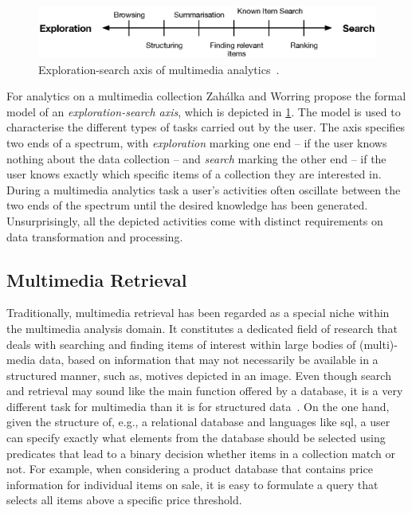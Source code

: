 \begin{figure}[h]
    \centering
    \includegraphics[width=\textwidth]{figures/exploration_search_axis.eps}
    \caption{Exploration-search axis of multimedia analytics~\cite{Zahalka:2014Towards}.}
    \label{figure:exploration-search-axis}
\end{figure}

For analytics on a multimedia collection Zahálka and Worring \cite{Zahalka:2014Towards} propose the formal model of an \emph{exploration-search axis}, which is depicted in \cref{figure:exploration-search-axis}. The model is used to characterise the different types of tasks carried out by the user. The axis specifies two ends of a spectrum, with \emph{exploration} marking one end -- if the user knows nothing about the data collection -- and \emph{search} marking the other end -- if the user knows exactly which specific items of a collection they are interested in. During a multimedia analytics task a user's activities often oscillate between the two ends of the spectrum until the desired knowledge has been generated. Unsurprisingly, all the depicted activities come with distinct requirements on data transformation and processing.

\subsection{Multimedia Retrieval}

Traditionally, multimedia retrieval has been regarded as a special niche within the  multimedia analysis domain. It constitutes a dedicated field of research that deals with searching and finding items of interest within large bodies of (multi)-media data, based on information that may not necessarily be available in a structured manner, such as, motives depicted in an image. Even though search and retrieval may sound like the main function offered by a database, it is a very different task for multimedia than it is for structured data~\cite{Blanken:2007multimedia}. On the one hand, given the structure of, e.g., a relational database and languages like \acrshort{sql}, a user can specify exactly what elements from the database should be selected using predicates that lead to a binary decision whether items in a collection match or not. For example, when considering a product database that contains price information for individual items on sale, it is easy to formulate a query that selects all items above a specific price threshold.

